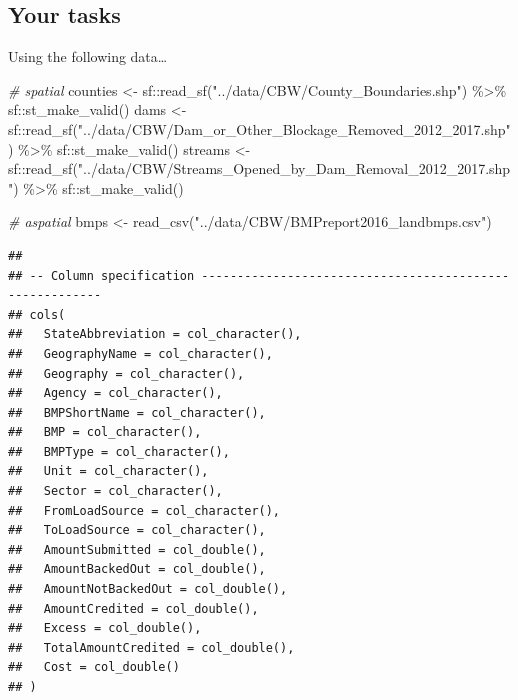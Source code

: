 \documentclass[]{article}
\newenvironment{Shaded}{\begin{snugshade}}{\end{snugshade}}
\newcommand{\CommentTok}[1]{\textcolor[rgb]{0.56,0.35,0.01}{\textit{#1}}}
\newcommand{\FunctionTok}[1]{\textcolor[rgb]{0.00,0.00,0.00}{#1}}
\newcommand{\NormalTok}[1]{#1}
\newcommand{\OtherTok}[1]{\textcolor[rgb]{0.56,0.35,0.01}{#1}}
\newcommand{\SpecialCharTok}[1]{\textcolor[rgb]{0.00,0.00,0.00}{#1}}
\newcommand{\StringTok}[1]{\textcolor[rgb]{0.31,0.60,0.02}{#1}}
\begin{document}
\newpage

\hypertarget{your-tasks}{%
\subsection{Your tasks}\label{your-tasks}}

Using the following data\ldots{}

\begin{Shaded}
\begin{Highlighting}[]
\CommentTok{\# spatial}
\NormalTok{counties }\OtherTok{\textless{}{-}}\NormalTok{ sf}\SpecialCharTok{::}\FunctionTok{read\_sf}\NormalTok{(}\StringTok{"../data/CBW/County\_Boundaries.shp"}\NormalTok{) }\SpecialCharTok{\%\textgreater{}\%}\NormalTok{ sf}\SpecialCharTok{::}\FunctionTok{st\_make\_valid}\NormalTok{()}
\NormalTok{dams }\OtherTok{\textless{}{-}}\NormalTok{ sf}\SpecialCharTok{::}\FunctionTok{read\_sf}\NormalTok{(}\StringTok{"../data/CBW/Dam\_or\_Other\_Blockage\_Removed\_2012\_2017.shp"}\NormalTok{) }\SpecialCharTok{\%\textgreater{}\%}\NormalTok{ sf}\SpecialCharTok{::}\FunctionTok{st\_make\_valid}\NormalTok{()}
\NormalTok{streams }\OtherTok{\textless{}{-}}\NormalTok{ sf}\SpecialCharTok{::}\FunctionTok{read\_sf}\NormalTok{(}\StringTok{"../data/CBW/Streams\_Opened\_by\_Dam\_Removal\_2012\_2017.shp"}\NormalTok{) }\SpecialCharTok{\%\textgreater{}\%}\NormalTok{ sf}\SpecialCharTok{::}\FunctionTok{st\_make\_valid}\NormalTok{()}

\CommentTok{\# aspatial}
\NormalTok{bmps }\OtherTok{\textless{}{-}} \FunctionTok{read\_csv}\NormalTok{(}\StringTok{"../data/CBW/BMPreport2016\_landbmps.csv"}\NormalTok{)}
\end{Highlighting}
\end{Shaded}

\begin{verbatim}
## 
## -- Column specification --------------------------------------------------------
## cols(
##   StateAbbreviation = col_character(),
##   GeographyName = col_character(),
##   Geography = col_character(),
##   Agency = col_character(),
##   BMPShortName = col_character(),
##   BMP = col_character(),
##   BMPType = col_character(),
##   Unit = col_character(),
##   Sector = col_character(),
##   FromLoadSource = col_character(),
##   ToLoadSource = col_character(),
##   AmountSubmitted = col_double(),
##   AmountBackedOut = col_double(),
##   AmountNotBackedOut = col_double(),
##   AmountCredited = col_double(),
##   Excess = col_double(),
##   TotalAmountCredited = col_double(),
##   Cost = col_double()
## )
\end{verbatim}
\end{document}
